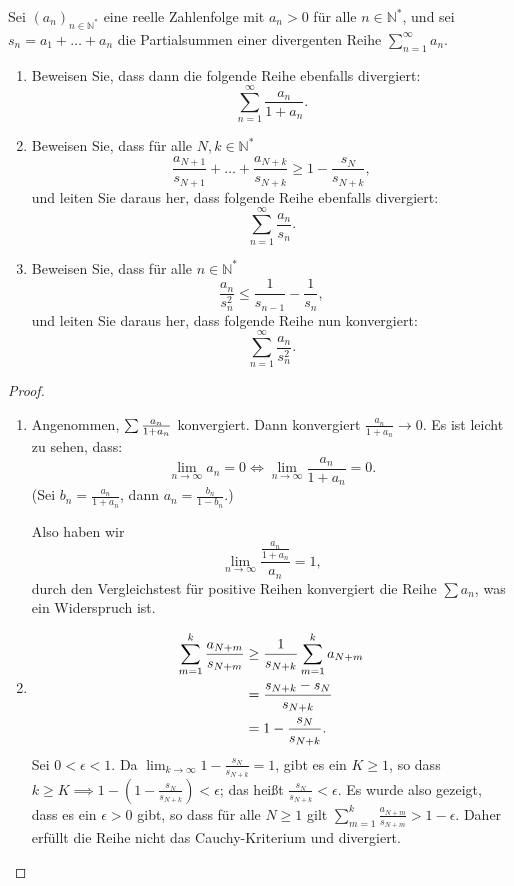 \documentclass{../problemset}
\begin{document}
\begin{problem}
Sei $(a_n)_{n\in\mathbb{N}^*}$ eine reelle Zahlenfolge mit $a_n > 0$ für alle $n \in \mathbb{N}^*$, und sei $s_n = a_1 + \ldots + a_n$ die Partialsummen einer divergenten Reihe $\sum_{n=1}^{\infty} a_n$.
\begin{enumerate}
	\item Beweisen Sie, dass dann die folgende Reihe ebenfalls divergiert:
	      \[
		      \sum_{n=1}^{\infty} \frac{a_n}{1 + a_n}.
	      \]
	\item Beweisen Sie, dass für alle $N, k \in \mathbb{N}^*$
	      \[
		      \frac{a_{N+1}}{s_{N+1}} + \ldots + \frac{a_{N+k}}{s_{N+k}} \geq 1 - \frac{s_N}{s_{N+k}},
	      \]
	      und leiten Sie daraus her, dass folgende Reihe ebenfalls divergiert:
	      \[
		      \sum_{n=1}^{\infty} \frac{a_n}{s_n}.
	      \]
	\item Beweisen Sie, dass für alle $n \in \mathbb{N}^*$
	      \[
		      \frac{a_n}{s_n^2} \leq \frac{1}{s_{n-1}} - \frac{1}{s_n},
	      \]
	      und leiten Sie daraus her, dass folgende Reihe nun konvergiert:
	      \[
		      \sum_{n=1}^{\infty} \frac{a_n}{s_n^2}.
	      \]
\end{enumerate}
\begin{proof}
	\begin{enumerate}
		\item Angenommen, $\sum{a_n\over 1+{a_n}}$ konvergiert.
		      Dann konvergiert $\frac{a_n}{1+a_n}\to 0$.
		      Es ist leicht zu sehen, dass: \[
			      \lim_{n\to\infty}a_n=0\iff \lim_{n\to\infty}\frac{a_n}{1+a_n}=0.
		      \]
		      (Sei $b_n=\frac{a_n}{1+a_n}$, dann $a_n=\frac{b_n}{1-b_n}$.)

		      Also haben wir \[
			      \lim_{n\to\infty}\frac{\frac{a_n}{1+a_n}}{a_n}=1,
		      \]
		      durch den Vergleichstest für positive Reihen konvergiert die Reihe $\sum a_n$, was ein Widerspruch ist.
		      \checkmark
		\item \begin{align}
			      \sum_{m=1}^k\frac{a_{N+m}}{s_{N+m}} & \ge\frac{1}{s_{N+k}}\sum_{m=1}^ka_{N+m} \\
			                                          & ={s_{N+k}-s_N\over s_{N+k}}             \\
			                                          & = 1-\frac{s_N}{s_{N+k}}.
		      \end{align}
		      Sei $0<\epsilon<1$. Da $\lim_{k\to\infty}1-\frac{s_N}{s_{N+k}}=1$, gibt es ein $K\ge 1$, so dass $k\ge K\implies 1-\left(1-\frac{s_N}{s_{N+k}}\right)<\epsilon$; das heißt $\frac{s_N}{s_{N+k}}<\epsilon$.
		      Es wurde also gezeigt, dass es ein $\epsilon>0$ gibt, so dass für alle $N\ge 1$ gilt $\sum_{m=1}^k\frac{a_{N+m}}{s_{N+m}}>1-\epsilon$.
		      Daher erfüllt die Reihe nicht das Cauchy-Kriterium und divergiert.
		      \checkmark


\end{enumerate}
\end{proof}
\end{problem}
\end{document}
